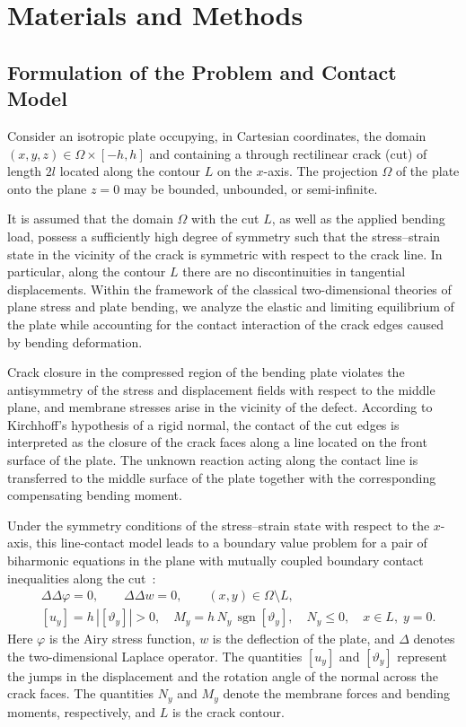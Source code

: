 \section{Materials and Methods}

\subsection{Formulation of the Problem and Contact Model}

Consider an isotropic plate occupying, in Cartesian coordinates, the domain $(x,y,z)\in\Omega\times[-h,h]$ and containing a through rectilinear crack (cut) of length $2l$ located along the contour $L$ on the $x$-axis. The projection $\Omega$ of the plate onto the plane $z=0$ may be bounded, unbounded, or semi-infinite. 

It is assumed that the domain $\Omega$ with the cut $L$, as well as the applied bending load, possess a sufficiently high degree of symmetry such that the stress--strain state in the vicinity of the crack is symmetric with respect to the crack line. In particular, along the contour $L$ there are no discontinuities in tangential displacements. Within the framework of the classical two-dimensional theories of plane stress and plate bending, we analyze the elastic and limiting equilibrium of the plate while accounting for the contact interaction of the crack edges caused by bending deformation.

Crack closure in the compressed region of the bending plate violates the antisymmetry of the stress and displacement fields with respect to the middle plane, and membrane stresses arise in the vicinity of the defect. According to Kirchhoff's hypothesis of a rigid normal, the contact of the cut edges is interpreted as the closure of the crack faces along a line located on the front surface of the plate. The unknown reaction acting along the contact line is transferred to the middle surface of the plate together with the corresponding compensating bending moment.

Under the symmetry conditions of the stress--strain state with respect to the $x$-axis, this line-contact model leads to a boundary value problem for a pair of biharmonic equations in the plane with mutually coupled boundary contact inequalities along the cut~\cite{Shatskyi2,Shatskyi4,Shatskyi6}:
\begin{align}
	&\Delta\Delta \varphi = 0, 
	\qquad 
	\Delta\Delta w = 0,
	\qquad 
	(x,y)\in\Omega\setminus L ,
	\label{ShatskyiEq1}
\\
	&[u_y] = h\,|[\vartheta_y]|>0, 
	\quad 
	M_y = h\,N_y\,\operatorname{sgn}[\vartheta_y], 
	\quad 
	N_y \le 0,
	\quad 
	x\in L,\; y=0 .
	\label{ShatskyiEq2}
\end{align}
%
Here $\varphi$ is the Airy stress function, $w$ is the deflection of the plate, and $\Delta$ denotes the two-dimensional Laplace operator. The quantities $[u_y]$ and $[\vartheta_y]$ represent the jumps in the displacement and the rotation angle of the normal across the crack faces. The quantities $N_y$ and $M_y$ denote the membrane forces and bending moments, respectively, and $L$ is the crack contour.

